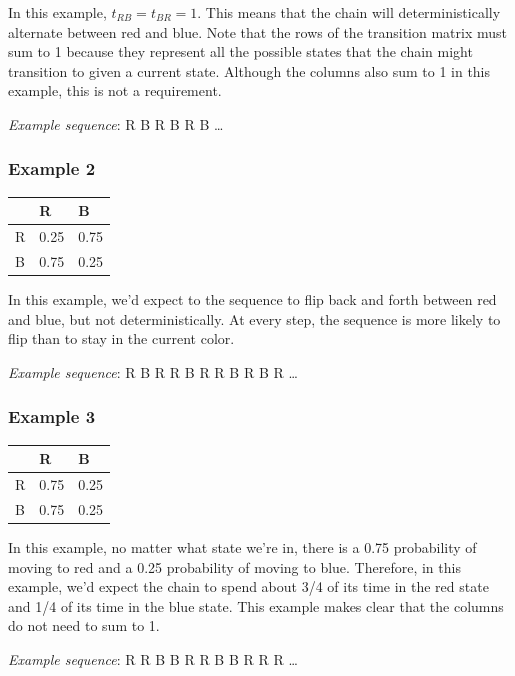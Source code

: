 \documentclass[
  letterpaper,
  DIV=11,
  numbers=noendperiod]{scrreprt}
\begin{document}
In this example, \(t_{RB} = t_{BR} = 1\). This means that the chain will
deterministically alternate between red and blue. Note that the rows of
the transition matrix must sum to 1 because they represent all the
possible states that the chain might transition to given a current
state. Although the columns also sum to 1 in this example, this is not a
requirement.

\emph{Example sequence}: {R} {B} {R} {B} {R} {B} \ldots{}

\subsubsection{Example 2}\label{markov-example2}

\begin{longtable}[]{@{}lll@{}}
\toprule\noalign{}
& R & B \\
\midrule\noalign{}
\endhead
\bottomrule\noalign{}
\endlastfoot
R & 0.25 & 0.75 \\
B & 0.75 & 0.25 \\
\end{longtable}

In this example, we'd expect to the sequence to flip back and forth
between red and blue, but not deterministically. At every step, the
sequence is more likely to flip than to stay in the current color.

\emph{Example sequence}: {R} {B} {R} {R} {B} {R} {R} {B} {R} {B} {R}
\ldots{}

\subsubsection{Example 3}\label{markov-example3}

\begin{longtable}[]{@{}lll@{}}
\toprule\noalign{}
& R & B \\
\midrule\noalign{}
\endhead
\bottomrule\noalign{}
\endlastfoot
R & 0.75 & 0.25 \\
B & 0.75 & 0.25 \\
\end{longtable}

In this example, no matter what state we're in, there is a 0.75
probability of moving to red and a 0.25 probability of moving to blue.
Therefore, in this example, we'd expect the chain to spend about 3/4 of
its time in the red state and 1/4 of its time in the blue state. This
example makes clear that the columns do not need to sum to 1.

\emph{Example sequence}: {R} {R} {B} {B} {R} {R} {B} {B} {R} {R} {R}
\ldots{}
\end{document}
